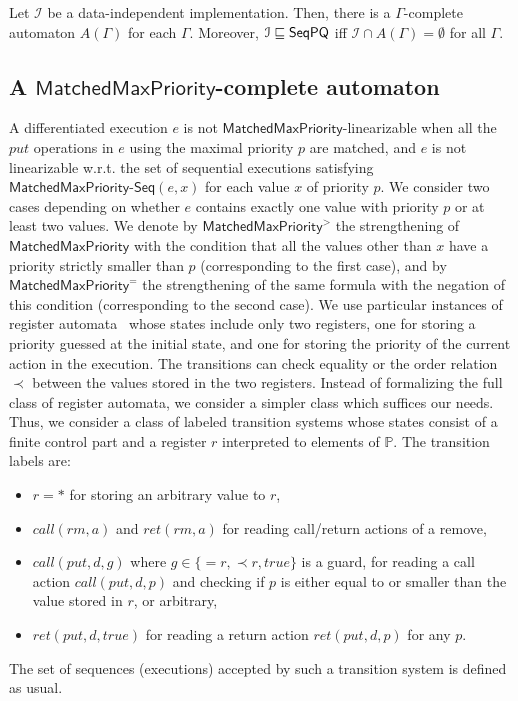 \begin{theorem}
\label{lemma:reduce EPQ into state reachability}
Let $\mathcal{I}$ be a data-independent implementation. Then, there is a $\Gamma$-complete automaton $A(\Gamma)$ for each $\Gamma$. Moreover,
$\mathcal{I} \sqsubseteq \mathsf{SeqPQ}$ iff $\mathcal{I} \cap A(\Gamma) = \emptyset$ for all $\Gamma$.
\end{theorem}



\subsection{A $\mathsf{MatchedMaxPriority}$-complete automaton}\label{ssec:aut}


A differentiated execution $e$ is not $\mathsf{MatchedMaxPriority}$-linearizable when all the $\textit{put}$ operations in $e$ using the maximal priority $p$ are matched, and $e$ is not linearizable w.r.t. the set of sequential executions satisfying $\mathsf{MatchedMaxPriority\text{-}Seq}(e,x)$ for each value $x$ of priority $p$. We consider two cases depending on whether $e$ contains exactly one value with priority $p$ or at least two values. We denote by $\mathsf{MatchedMaxPriority}^{>}$ the strengthening of $\mathsf{MatchedMaxPriority}$ with the condition that all the values other than $x$ have a priority strictly smaller than $p$ (corresponding to the first case), and by $\mathsf{MatchedMaxPriority}^{=}$ the strengthening of the same formula with the negation of this condition (corresponding to the second case).
We use particular instances of register automata~\cite{DBLP:journals/tcs/KaminskiF94,DBLP:conf/icalp/Cerans94,DBLP:conf/stacs/SegoufinT11} whose states include only two registers, one for storing a priority guessed at the initial state, and one for storing the priority of the current action in the execution. The transitions can check equality or the order relation $\prec$ between the values stored in the two registers. Instead of formalizing the full class of register automata, we consider a simpler class which suffices our needs. Thus, we consider a class of labeled transition systems whose states consist of a finite control part and a register $r$ interpreted to elements of $\mathbb{P}$. The transition labels are:
\begin{itemize}
	\item $r=*$ for storing an arbitrary value to $r$,
	\item $\textit{call}(\textit{rm},a)$ and $\textit{ret}(\textit{rm},a)$ for reading call/return actions of a remove,
	\item $\textit{call}(\textit{put},d,g)$ where $g\in\{=r,\prec r,true\}$ is a guard, for reading a call action $\textit{call}(\textit{put},d,p)$ and checking if $p$ is either equal to or smaller than the value stored in $r$, or arbitrary,
	\item $\textit{ret}(\textit{put},d,true)$ for reading a return action $\textit{ret}(\textit{put},d,p)$ for any $p$.
\end{itemize}
The set of sequences (executions) accepted by such a transition system is defined as usual.





